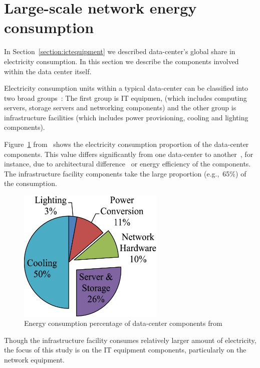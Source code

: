 \section {Large-scale network energy consumption}
\label{section:datacenter} 
In Section~\ref{section:ictequipment} we described data-center's global share in electricity consumption. In this section we describe the components involved within the data center itself.

Electricity consumption units within a typical data-center can be classified into two broad groups~\cite{DBLP:journals/comsur/DayarathnaWF16}: The first group is IT equipmen, (which includes computing servers, storage servers and networking components) and the other group is infrastructure facilities (which includes power provisioning, cooling and lighting components).

Figure~\ref{fig:datacenterenergy} from~\cite{DBLP:journals/comsur/DayarathnaWF16} shows the electricity consumption proportion of the data-center components. This value differs significantly from one data-center to another~\cite{DBLP:series/synthesis/2013Barroso}, for instance, due to architectural difference~\cite{DBLP:conf/eenergy/GyarmatiT10} or energy efficiency of the components. The infrastructure facility components take the large proportion (e.g.,~65\%) of the consumption. 
\begin{figure}[ht]
	\begin{center}
		\includegraphics[width=7cm]{images/datacenterenergy.pdf}
		\caption{Energy consumption percentage of data-center components from~\cite{DBLP:journals/comsur/DayarathnaWF16}}
		\label{fig:datacenterenergy}
	\end{center}
\end{figure}

Though the infrastructure facility consumes relatively larger amount of electricity, the focus of this study is on the IT equipment components, particularly on the network equipment. 

